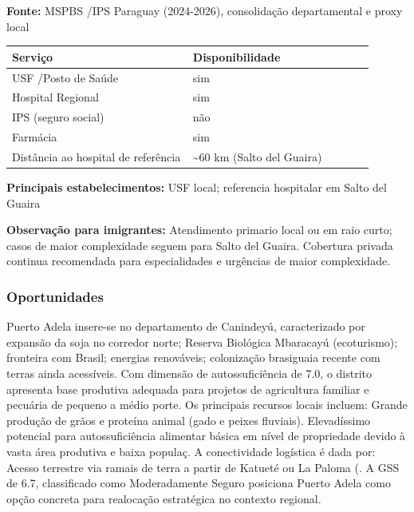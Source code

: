 \textbf{Fonte:} MSPBS /\allowbreak  IPS Paraguay (2024-2026), consolidação
departamental e proxy local

{\def\LTcaptype{none} %
\begin{longtable}{@{}>{\raggedright\arraybackslash}p{0.45\linewidth} >{\raggedright\arraybackslash}p{0.45\linewidth}@{}}
\toprule\noalign{}
Serviço & Disponibilidade \\
\midrule\noalign{}
\endhead
\bottomrule\noalign{}
\endlastfoot
USF /\allowbreak  Posto de Saúde & sim \\
Hospital Regional & sim \\
IPS (seguro social) & não \\
Farmácia & sim \\
Distância ao hospital de referência & \textasciitilde60 km (Salto del
Guaira) \\
\end{longtable}
}

\textbf{Principais estabelecimentos:} USF local; referencia hospitalar
em Salto del Guaira

\textbf{Observação para imigrantes:} Atendimento primario local ou em
raio curto; casos de maior complexidade seguem para Salto del Guaira.
Cobertura privada continua recomendada para especialidades e urgências
de maior complexidade.
\newpage

\subsubsection*{Oportunidades}\label{oport-puerto-adela-1415}
Puerto Adela insere-se no departamento de Canindeyú, caracterizado por expansão da soja no corredor norte; Reserva Biológica Mbaracayú (ecoturismo); fronteira com Brasil; energias renováveis; colonização brasiguaia recente com terras ainda acessíveis. Com dimensão de autossuficiência de 7.0, o distrito apresenta base produtiva adequada para projetos de agricultura familiar e pecuária de pequeno a médio porte. Os principais recursos locais incluem: Grande produção de grãos e proteína animal (gado e peixes fluviais). Elevadíssimo potencial para autossuficiência alimentar básica em nível de propriedade devido à vasta área produtiva e baixa populaç. A conectividade logística é dada por: Acesso terrestre via ramais de terra a partir de Katueté ou La Paloma (. A GSS de 6.7, classificado como Moderadamente Seguro posiciona Puerto Adela como opção concreta para realocação estratégica no contexto regional.


